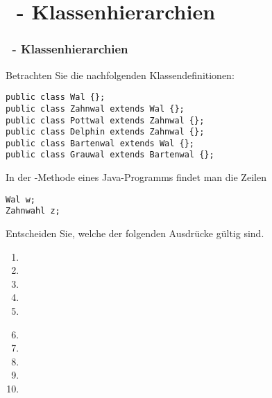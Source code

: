 \def\stitle{\theexercise\ - Klassenhierarchien}
\section{\stitle}

\begin{frame}[fragile]%
  \frametitle{\stitle}%
Betrachten Sie die nachfolgenden Klassendefinitionen:

\begin{lstlisting}
public class Wal {};
public class Zahnwal extends Wal {};
public class Pottwal extends Zahnwal {};
public class Delphin extends Zahnwal {};
public class Bartenwal extends Wal {};
public class Grauwal extends Bartenwal {};
\end{lstlisting}

In der -Methode eines Java-Programms findet man die Zeilen

\begin{lstlisting}
Wal w;
Zahnwahl z;
\end{lstlisting}

Entscheiden Sie, welche der folgenden Ausdr\"ucke g\"ultig sind.
\begin{center}
\begin{minipage}{0.49\textwidth}
\begin{enumerate}
\item {}
\item {}
\item {}
\item {}
\item {}
\end{enumerate}
\end{minipage}
\begin{minipage}{0.49\textwidth}
\begin{enumerate}
\setcounter{enumi}{5}
\item {}
\item {}
\item {}
\item {}
\item {}
\end{enumerate}
\end{minipage}
\end{center}
\end{frame}


